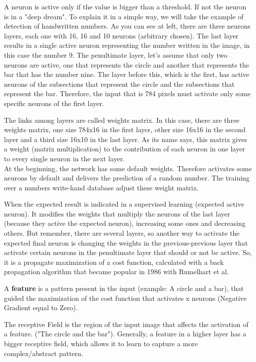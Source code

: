 \documentclass[10pt]{article}
\begin{document}
A neuron is active only if the value is bigger than a threshold. If not the neuron is in a "deep dream".
To explain it in a simple way, we will take the example of detection of handwritten numbers. As you can see at left, there are three neurons layers, each one with 16, 16 and 10 neurons (arbitrary chosen). The last layer results in a single active neuron representing the number written in the image, in this case the number 9. The penultimate layer, let's assume that only two neurons are active, one that represents the circle and another that represents the bar that has the number nine. The layer before this, which is the first, has active neurons of the subsections that represent the circle and the subsections that represent the bar. Therefore, the input that is 784 pixels must activate only some specific neurons of the first layer. 

The links among layers are called weights matrix. In this case, there are three weights matrix, one size 784x16 in the first layer, other size 16x16 in the second layer and a third size 16x10 in the last layer. As its name says, this matrix gives a weight (matrix multiplication) to the contribution of each neuron in one layer to every single neuron in the next layer.\\

At the beginning, the network has some default weights. Therefore activates some neurons by default and delivers the prediction of a random number. The training over a numbers write-hand database adjust these weight matrix. 

When the expected result is indicated in a supervised learning (expected active neuron). It modifies the weights that multiply the neurons of the last layer (because they active the expected neuron), increasing some ones and decreasing others. But remember, there are several layers, so another way to activate the expected final neuron is changing the weights in the previous-previous layer that activate certain neurons in the penultimate layer that should or not be active. So, it is a propagate maximization of a cost function, calculated with a back propagation algorithm that became popular in 1986 with Rumelhart et al.\cite{rumelhart1986learning}

A \textbf{feature} is a pattern present in the input (example: A circle and a bar), that  guided the maximization of the cost function that activates x neurons (Negative Gradient equal to Zero). 

The receptive Field is the region of the input image that affects the activation of a feature. ("The circle and the bar"). Generally, a feature in a higher layer has a bigger receptive field,  which allows it to learn to capture a more complex/abstract pattern. 
\end{document}
